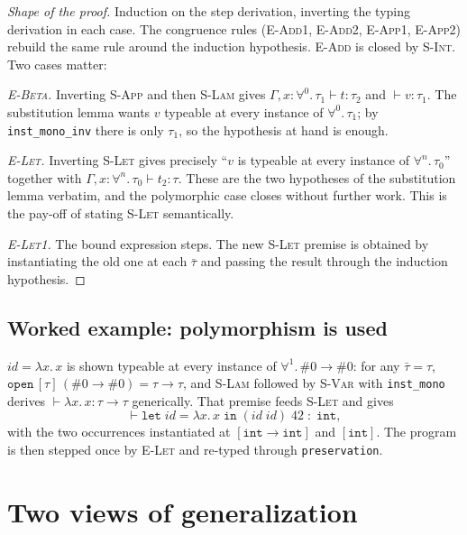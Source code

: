 \documentclass[11pt,a4paper]{article}
\newcommand{\tint}{\mathtt{int}}
\begin{document}
\begin{proof}[Shape of the proof]
Induction on the step derivation, inverting the typing derivation in each
case.  The congruence rules (\textsc{E-Add1}, \textsc{E-Add2},
\textsc{E-App1}, \textsc{E-App2}) rebuild the same rule around the induction
hypothesis.  \textsc{E-Add} is closed by \textsc{S-Int}.  Two cases matter:

\emph{\textsc{E-Beta}.}  Inverting \textsc{S-App} and then \textsc{S-Lam}
gives $\Gamma, x{:}\forall^{0}.\,\tau_1 \vdash t : \tau_2$ and
$\vdash v : \tau_1$.  The substitution lemma wants $v$ typeable at every
instance of $\forall^{0}.\,\tau_1$; by \texttt{inst\_mono\_inv} there is only
$\tau_1$, so the hypothesis at hand is enough.

\emph{\textsc{E-Let}.}  Inverting \textsc{S-Let} gives precisely
``$v$ is typeable at every instance of $\forall^{n}.\,\tau_0$'' together with
$\Gamma, x{:}\forall^{n}.\,\tau_0 \vdash t_2 : \tau$.  These are the two
hypotheses of the substitution lemma verbatim, and the polymorphic case closes
without further work.  This is the pay-off of stating \textsc{S-Let}
semantically.

\emph{\textsc{E-Let1}.}  The bound expression steps.  The new
\textsc{S-Let} premise is obtained by instantiating the old one at each
$\bar\tau$ and passing the result through the induction hypothesis.
\end{proof}

\subsection{Worked example: polymorphism is used}

$\mathit{id} = \lambda x.\,x$ is shown typeable at every instance of
$\forall^{1}.\,\#0 \to \#0$: for any $\bar\tau = \tau$,
$\mathtt{open}\,[\tau]\,(\#0 \to \#0) = \tau \to \tau$, and
\textsc{S-Lam} followed by \textsc{S-Var} with \texttt{inst\_mono} derives
$\vdash \lambda x.\,x : \tau \to \tau$ generically.  That premise feeds
\textsc{S-Let} and gives
\[
  \vdash \mathtt{let}\;\mathit{id} = \lambda x.\,x\;\mathtt{in}\;
  (\mathit{id}\;\mathit{id})\;42 \;:\; \tint,
\]
with the two occurrences instantiated at $[\tint \to \tint]$ and $[\tint]$.
The program is then stepped once by \textsc{E-Let} and re-typed through
\texttt{preservation}.

\section{Two views of generalization}
\end{document}
